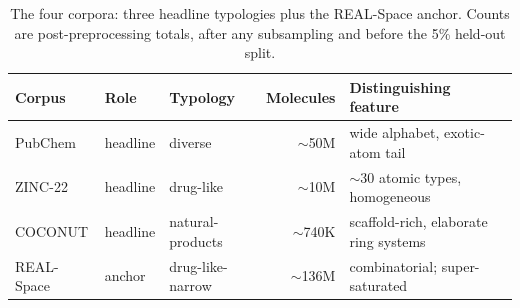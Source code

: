 \begin{table}[htbp]
  \centering
  \caption{The four corpora: three headline typologies plus the REAL-Space
  anchor. Counts are post-preprocessing totals, after any subsampling and
  before the 5\% held-out split.}
  \label{tab:corpora}
  \small
  \begin{tabular}{@{}l l l r l@{}}
    \toprule
    Corpus & Role & Typology & Molecules & Distinguishing feature \\
    \midrule
    PubChem \citep{pubchem2023} & headline & diverse & $\sim$50M & wide alphabet, exotic-atom tail \\
    ZINC-22 \citep{zinc22} & headline & drug-like & $\sim$10M & $\sim$30 atomic types, homogeneous \\
    COCONUT \citep{sorokina2021coconut} & headline & natural-products & $\sim$740K & scaffold-rich, elaborate ring systems \\
    \midrule
    REAL-Space \citep{grygorenko2020real, wadell2026smirk} & anchor & drug-like-narrow & $\sim$136M & combinatorial; super-saturated \\
    \bottomrule
  \end{tabular}
\end{table}
